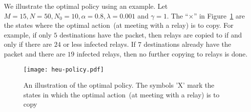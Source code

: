 \documentclass[10pt,journal,letterpaper]{IEEEtran}
\newtheorem{remarks}{Remarks}[section]
\newcommand{\remove}[1]{}
\begin{document}
\remove{
\begin{remarks}
\label{remark:Phi} Observe that $\Phi(m,n)$ is decreasing in $m$ for
a given $n$ and also decreasing in $n$ for a given $m$. Thus the
optimal policy has the following properties.\\
\begin{inparaenum}[1)]
\item If $u^{\ast}(m,n,r) = 0$, then $u^{\ast}(i,n,r) = 0$ for all $m < i < M$.\\
\item If $u^{\ast}(m,n,r) = 0$, then $u^{\ast}(m,j,r) = 0$ for all $n < j < N$.
\end{inparaenum}

Thus the optimal solution can be given a ``stopping''
interpretation. More precisely, if the packet is not copied at a
meeting with a susceptible relay, it is not copied to relays in
future meetings. A priori however, we did not know if such a
``stopping'' was optimal.
\end{remarks}
}
\remove{
\begin{remarks}
Also observe that
 \[
 J_{1s} (m,n,r) = J_{0s} (m,n+1,r) + \gamma
 \]
 Hence
\begin{align*}
A((m,n+1,r),) - \Phi(m,n) =
 J_{1s} (m,n,r) - J_{0s} (m,n,r)
 = J_{0s} (m,n+1,r) - J_{0s} (m,n,r)  + \gamma
 \end{align*}
 Since phi is decreasing in m, we conclude that
\begin{enumerate}
\item $ J_{0s} $ is convex in $m$, and thus so is $J_{1s}$
\item They are both submodular
\end{enumerate}
\end{remarks}
}

We illustrate the optimal policy using an example. Let $M =15, N=
50, N_0 = 10, \alpha = 0.8, \lambda = 0.001$ and $\gamma = 1$. The
``$\times$'' in Figure~\ref{fig:heu-policy} are the
states where the optimal action~(at meeting with a relay) is to
copy. For example, if only $5$ destinations have the packet, then
relays are copied to if and only if there are $24$ or less infected
relays. If $7$ destinations already have the packet and there are
$19$ infected relays, then no further copying to relays is done.
\begin{figure}[t]{
\centering
\texttt{[image: heu-policy.pdf]}
\caption{An illustration of the optimal policy. The symbols 'X' mark
the states in which the optimal action~(at meeting with a relay) is
to copy}
 \label{fig:heu-policy}}
\end{figure}
\end{document}
